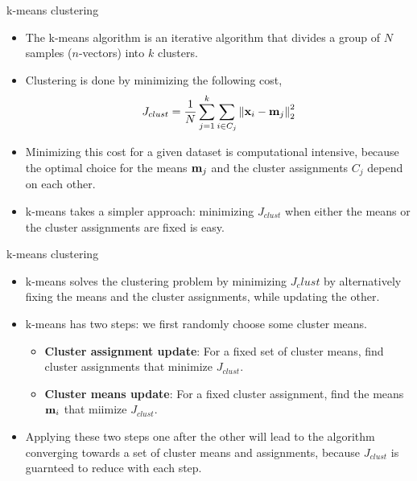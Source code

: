 \documentclass[aspectratio=169]{beamer}
\let\olditem\item
\renewcommand{\item}{\setlength{\itemsep}{\fill}\olditem}
\def\mf{\ensuremath\mathbf}
\def\lV{\ensuremath\left\lVert}
\def\rV{\ensuremath\right\rVert}
\begin{document}
\begin{frame}[t]{k-means clustering}
  \begin{itemize}
    \item The k-means algorithm is an iterative algorithm that divides a group of $N$ samples ($n$-vectors) into $k$ clusters.

    \item Clustering is done by minimizing the following cost,
    \[ J_{clust} = \frac{1}{N}\sum_{j=1}^k \sum_{i \in C_j} \lV \mf{x}_i - \mf{m}_j \rV_2^2 \]
  
    \item Minimizing this cost for a given dataset is computational intensive, because the optimal choice for the means $\mf{m}_j$ and the cluster assignments $C_j$ depend on each other.
    
    \item k-means takes a simpler approach: minimizing $J_{clust}$ when either the means or the cluster assignments are fixed is easy. 
  \end{itemize}
\end{frame}


\begin{frame}[t]{k-means clustering}
  \begin{itemize}
    \item k-means solves the clustering problem by minimizing $J_clust$ by alternatively fixing the means and the cluster assignments, while updating the other.
    \item k-means has two steps: we first randomly choose some cluster means.
    \begin{itemize}
      \item \textbf{Cluster assignment update}: For a fixed set of cluster means, find cluster assignments that minimize $J_{clust}$.
      \item \textbf{Cluster means update}: For a fixed cluster assignment, find the means $\mf{m}_i$ that miimize $J_{clust}$.
    \end{itemize}
    \item Applying these two steps one after the other will lead to the algorithm converging towards a set of cluster means and assignments, because $J_{clust}$ is guarnteed to reduce with each step.
  \end{itemize}
\end{frame}
\end{document}
